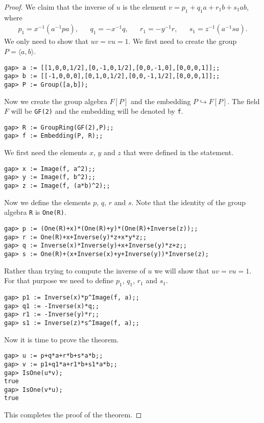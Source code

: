 \begin{proof}
    We claim that the inverse of $u$
    is the element $v=p_1+q_1a+r_1b+s_1ab$, where
    \begin{align*}
        p_1=x^{-1}(a^{-1}pa),
        && q_1=-x^{-1}q,
        && r_1=-y^{-1}r,
        && s_1=z^{-1}(a^{-1}sa).
    \end{align*}
    We only need to show that $uv=vu=1$. 
    We first need to create the group $P=\langle a,b\rangle$.
\begin{lstlisting}
gap> a := [[1,0,0,1/2],[0,-1,0,1/2],[0,0,-1,0],[0,0,0,1]];;
gap> b := [[-1,0,0,0],[0,1,0,1/2],[0,0,-1,1/2],[0,0,0,1]];;
gap> P := Group([a,b]);
\end{lstlisting}
    Now we create the group algebra $F[P]$ and
    the embedding $P\hookrightarrow F[P]$.
    The field $F$ will be \lstinline{GF(2)}
    and the embedding will be denoted by \lstinline{f}.
\begin{lstlisting}
gap> R := GroupRing(GF(2),P);;
gap> f := Embedding(P, R);;
\end{lstlisting}
    We first need the elements $x$, $y$ and $z$ that were defined in the
    statement.
\begin{lstlisting}
gap> x := Image(f, a^2);;
gap> y := Image(f, b^2);;
gap> z := Image(f, (a*b)^2);;
\end{lstlisting}
    Now we define the elements $p$, $q$, $r$ and $s$. Note that
    the identity of the group algebra \lstinline{R}
    is \lstinline{One(R)}.
\begin{lstlisting}
gap> p := (One(R)+x)*(One(R)+y)*(One(R)+Inverse(z));;
gap> r := One(R)+x+Inverse(y)*z+x*y*z;;
gap> q := Inverse(x)*Inverse(y)+x+Inverse(y)*z+z;;
gap> s := One(R)+(x+Inverse(x)+y+Inverse(y))*Inverse(z);
\end{lstlisting}
    Rather than trying
    to compute the inverse of $u$ we will show that
    $uv=vu=1$. For that purpose we need to define
    $p_1$, $q_1$, $r_1$ and $s_1$.
\begin{lstlisting}
gap> p1 := Inverse(x)*p^Image(f, a);;
gap> q1 := -Inverse(x)*q;;
gap> r1 := -Inverse(y)*r;;
gap> s1 := Inverse(z)*s^Image(f, a);;
\end{lstlisting}
Now it is time to prove the theorem.
\begin{lstlisting}
gap> u := p+q*a+r*b+s*a*b;;
gap> v := p1+q1*a+r1*b+s1*a*b;;
gap> IsOne(u*v);
true
gap> IsOne(v*u);
true
\end{lstlisting}
This completes the proof of the theorem.
\end{proof}


